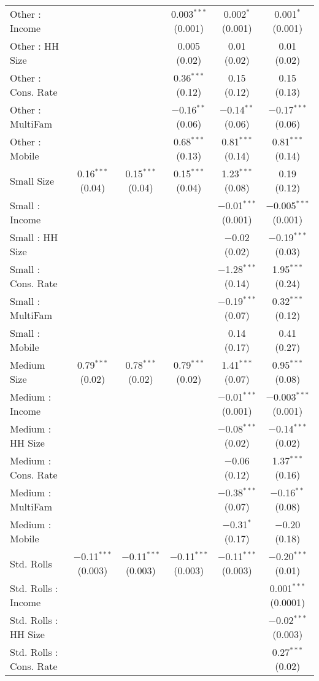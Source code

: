 \begin{table}[!htbp]
\begin{tabular}{@{\extracolsep{5pt}}lccccc}
  Other : Income &  &  & 0.003$^{***}$ (0.001) & 0.002$^{*}$ (0.001) & 0.001$^{*}$ (0.001) \\ 
  Other : HH Size &  &  & 0.005 (0.02) & 0.01 (0.02) & 0.01 (0.02) \\ 
  Other : Cons. Rate &  &  & 0.36$^{***}$ (0.12) & 0.15 (0.12) & 0.15 (0.13) \\ 
  Other : MultiFam &  &  & $-$0.16$^{**}$ (0.06) & $-$0.14$^{**}$ (0.06) & $-$0.17$^{***}$ (0.06) \\ 
  Other : Mobile &  &  & 0.68$^{***}$ (0.13) & 0.81$^{***}$ (0.14) & 0.81$^{***}$ (0.14) \\ 
  Small Size & 0.16$^{***}$ (0.04) & 0.15$^{***}$ (0.04) & 0.15$^{***}$ (0.04) & 1.23$^{***}$ (0.08) & 0.19 (0.12) \\ 
  Small : Income &  &  &  & $-$0.01$^{***}$ (0.001) & $-$0.005$^{***}$ (0.001) \\ 
  Small : HH Size &  &  &  & $-$0.02 (0.02) & $-$0.19$^{***}$ (0.03) \\ 
  Small : Cons. Rate &  &  &  & $-$1.28$^{***}$ (0.14) & 1.95$^{***}$ (0.24) \\ 
  Small : MultiFam &  &  &  & $-$0.19$^{***}$ (0.07) & 0.32$^{***}$ (0.12) \\ 
  Small : Mobile &  &  &  & 0.14 (0.17) & 0.41 (0.27) \\ 
  Medium Size & 0.79$^{***}$ (0.02) & 0.78$^{***}$ (0.02) & 0.79$^{***}$ (0.02) & 1.41$^{***}$ (0.07) & 0.95$^{***}$ (0.08) \\ 
  Medium : Income &  &  &  & $-$0.01$^{***}$ (0.001) & $-$0.003$^{***}$ (0.001) \\ 
  Medium : HH Size &  &  &  & $-$0.08$^{***}$ (0.02) & $-$0.14$^{***}$ (0.02) \\ 
  Medium : Cons. Rate &  &  &  & $-$0.06 (0.12) & 1.37$^{***}$ (0.16) \\ 
  Medium : MultiFam &  &  &  & $-$0.38$^{***}$ (0.07) & $-$0.16$^{**}$ (0.08) \\ 
  Medium : Mobile &  &  &  & $-$0.31$^{*}$ (0.17) & $-$0.20 (0.18) \\ 
  Std. Rolls & $-$0.11$^{***}$ (0.003) & $-$0.11$^{***}$ (0.003) & $-$0.11$^{***}$ (0.003) & $-$0.11$^{***}$ (0.003) & $-$0.20$^{***}$ (0.01) \\ 
  Std. Rolls : Income &  &  &  &  & 0.001$^{***}$ (0.0001) \\ 
  Std. Rolls : HH Size &  &  &  &  & $-$0.02$^{***}$ (0.003) \\ 
  Std. Rolls : Cons. Rate &  &  &  &  & 0.27$^{***}$ (0.02) \\ 

\end{tabular}
\end{table}
